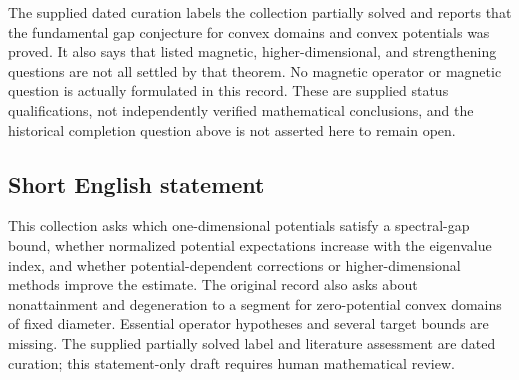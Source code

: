 \documentclass[11pt]{article}
\begin{document}
The supplied dated curation labels the collection partially solved and reports that the fundamental gap conjecture for convex domains and convex potentials was proved. It also says that listed magnetic, higher-dimensional, and strengthening questions are not all settled by that theorem. No magnetic operator or magnetic question is actually formulated in this record. These are supplied status qualifications, not independently verified mathematical conclusions, and the historical completion question above is not asserted here to remain open.
\subsection{Short English statement}
This collection asks which one-dimensional potentials satisfy a spectral-gap bound, whether normalized potential expectations increase with the eigenvalue index, and whether potential-dependent corrections or higher-dimensional methods improve the estimate. The original record also asks about nonattainment and degeneration to a segment for zero-potential convex domains of fixed diameter. Essential operator hypotheses and several target bounds are missing. The supplied partially solved label and literature assessment are dated curation; this statement-only draft requires human mathematical review.
\end{document}
